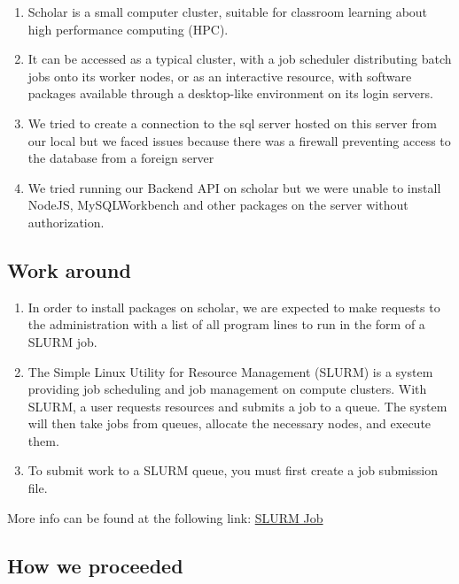 \documentclass[]{book}
\providecommand{\tightlist}{%
  \setlength{\itemsep}{0pt}\setlength{\parskip}{0pt}}
\begin{document}
\begin{enumerate}
\def\labelenumi{\arabic{enumi}.}
\tightlist
\item
  Scholar is a small computer cluster, suitable for classroom learning about high performance computing (HPC).
\item
  It can be accessed as a typical cluster, with a job scheduler distributing batch jobs onto its worker nodes, or as an interactive resource, with software packages available through a desktop-like environment on its login servers.
\item
  We tried to create a connection to the sql server hosted on this server from our local but we faced issues because there was a firewall preventing access to the database from a foreign server
\item
  We tried running our Backend API on scholar but we were unable to install NodeJS, MySQLWorkbench and other packages on the server without authorization.
\end{enumerate}

\hypertarget{work-around}{%
\subsection{Work around}\label{work-around}}

\begin{enumerate}
\def\labelenumi{\arabic{enumi}.}
\item
  In order to install packages on scholar, we are expected to make requests to the administration with a list of all program lines to run in the form of a SLURM job.
\item
  The Simple Linux Utility for Resource Management (SLURM) is a system providing job scheduling and job management on compute clusters. With SLURM, a user requests resources and submits a job to a queue. The system will then take jobs from queues, allocate the necessary nodes, and execute them.
\item
  To submit work to a SLURM queue, you must first create a job submission file.
\end{enumerate}

More info can be found at the following link: \href{https://www.rcac.purdue.edu/knowledge/weber/run/slurm}{SLURM Job}

\hypertarget{how-we-proceeded}{%
\subsection{How we proceeded}\label{how-we-proceeded}}
\end{document}
